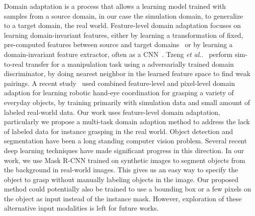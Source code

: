 \documentclass[letterpaper, 10 pt, conference]{ieeeconf}  %
\makeatletter
\newcommand{\etal}{~et al.~}
\DeclareRobustCommand\onedot{\futurelet\@let@token\@onedot}
\def\@onedot{\ifx\@let@token.\else.\null\fi\xspace}
\def\etal{\emph{et al}\onedot}
\makeatother
\begin{document}
Domain adaptation is a process that allows a learning model trained with samples from a source domain, in our case the simulation domain, to generalize to a target domain, the real world. Feature-level domain adaptation focuses on learning domain-invariant features, either by learning a transformation of fixed, pre-computed features between source and target domains~\cite{sun2015return,gong2012geodesic,caseiro2015beyond,gopalan2011domain} or by learning a domain-invariant feature extractor, often as a CNN~\cite{ganin2016domain, long2015learning, tzeng2015ddc, bousmalis2016domain}. Tzeng \etal~\cite{tzeng2016adapting} perform sim-to-real transfer for a manipulation task using a adversarially trained domain discriminator, by doing nearest neighbor in the learned feature space to find weak pairings. A recent study~\cite{bousmalis-2018} used combined feature-level and pixel-level domain adaption for learning robotic hand-eye coordination for grasping a variety of everyday objects, by training primarily with simulation data and small amount of labeled real-world data. Our work uses feature-level domain adaptation, particularly we propose a multi-task domain adaption method to address the lack of labeled data for instance grasping in the real world.
Object detection and segmentation have been a long standing computer vision problem. Several recent deep learning techniques \cite{he2017mask, Girshick2014RichFH, He2014SpatialPP, Girshick2015FastR, ren2015faster, Redmon2016YouOL, Shelhamer2015FullyCN, Chen2017DeepLabSI} have made significant progress in this direction. In our work, we use Mask R-CNN \cite{he2017mask} trained on synthetic images to segment objects from the background in real-world images. This gives us an easy way to specify the object to grasp without manually labeling objects in the image. Our proposed method could potentially also be trained to use a bounding box or a few pixels on the object as input instead of the instance mask. However, exploration of these alternative input modalities is left for future works.
\end{document}
